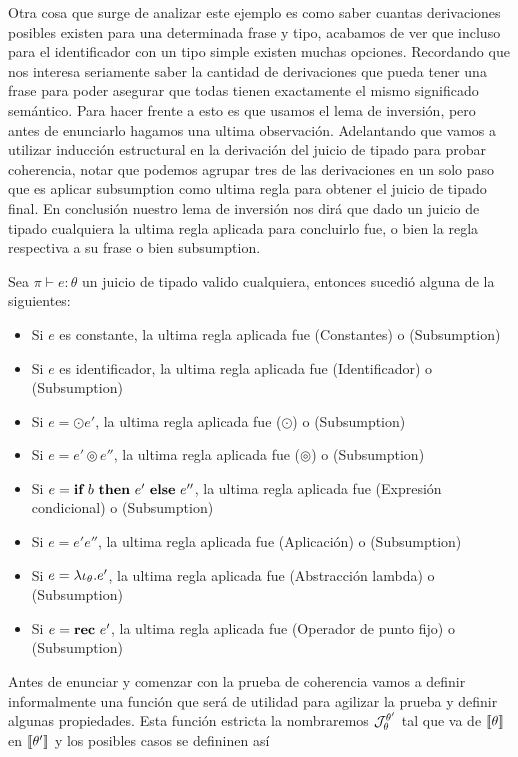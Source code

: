 Otra cosa que surge de analizar este ejemplo es como saber cuantas derivaciones
posibles existen para una determinada frase y tipo, acabamos de ver que
incluso para el identificador con un tipo simple existen muchas opciones.
Recordando que nos interesa seriamente saber la cantidad de derivaciones 
que pueda tener una frase para poder asegurar que todas tienen exactamente
el mismo significado sem\'antico. Para hacer frente a esto es que usamos 
el lema de inversi\'on, pero antes de enunciarlo hagamos una ultima observaci\'on.
Adelantando que vamos a utilizar inducci\'on estructural en la derivaci\'on
del juicio de tipado para probar coherencia, notar que podemos agrupar
tres de las derivaciones en un solo paso que es aplicar 
subsumption como ultima regla para obtener el juicio de tipado final. En
conclusi\'on nuestro lema de inversi\'on nos dir\'a que dado un juicio de 
tipado cualquiera la ultima regla aplicada para concluirlo fue, o bien
la regla respectiva a su frase o bien subsumption.

\begin{lemma}[De inversi\'on]
Sea $\pi \vdash e : \theta$ un juicio de tipado valido cualquiera, entonces
sucedi\'o alguna de la siguientes:

\begin{itemize}
\item Si $e$ es constante, la ultima regla aplicada fue (Constantes) o (Subsumption)
\item Si $e$ es identificador, la ultima regla aplicada fue (Identificador) o (Subsumption)
\item Si $e = \odot e'$, la ultima regla aplicada fue ($\odot$) o (Subsumption)
\item Si $e = e' \circledcirc e''$, la ultima regla aplicada fue 
($\circledcirc$) o (Subsumption)
\item Si $e = \textbf{if} \ b \ \textbf{then} \ e' \ \textbf{else} \ e''$, la ultima regla aplicada fue 
(Expresi\'on condicional) o (Subsumption)
\item Si $e = e'e''$, la ultima regla aplicada fue (Aplicaci\'on) o (Subsumption)
\item Si $e = \lambda \iota_{\theta} . e'$, la ultima regla aplicada fue 
(Abstracci\'on lambda) o (Subsumption)
\item Si $e = \textbf{rec} \ e'$, la ultima regla aplicada fue (Operador de punto fijo) o (Subsumption)
\end{itemize}

\end{lemma}

Antes de enunciar y comenzar con la prueba de coherencia vamos a definir informalmente una 
funci\'on que ser\'a de utilidad para agilizar la prueba y definir algunas
propiedades. Esta funci\'on estricta la nombraremos $\mathcal{J}_{\theta}^{\theta'}$ tal que
va de $\llbracket \theta \rrbracket$ en $\llbracket \theta' \rrbracket$ y los posibles casos se defininen as\'i\\

